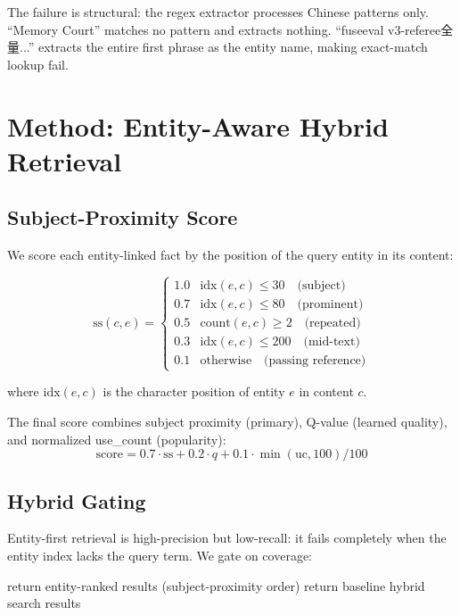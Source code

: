\documentclass[11pt]{article}
\begin{document}
The failure is structural: the regex extractor processes Chinese patterns only. ``Memory Court'' matches no pattern and extracts nothing. ``fuseeval v3-referee全量...'' extracts the entire first phrase as the entity name, making exact-match lookup fail.

\section{Method: Entity-Aware Hybrid Retrieval}

\subsection{Subject-Proximity Score}

We score each entity-linked fact by the position of the query entity in its content:

\begin{equation}
\text{ss}(c, e) = \begin{cases}
1.0 & \text{idx}(e, c) \leq 30 \quad \text{(subject)} \\
0.7 & \text{idx}(e, c) \leq 80 \quad \text{(prominent)} \\
0.5 & \text{count}(e, c) \geq 2 \quad \text{(repeated)} \\
0.3 & \text{idx}(e, c) \leq 200 \quad \text{(mid-text)} \\
0.1 & \text{otherwise} \quad \text{(passing reference)}
\end{cases}
\end{equation}

\noindent where $\text{idx}(e,c)$ is the character position of entity $e$ in content $c$.

The final score combines subject proximity (primary), Q-value (learned quality), and normalized use\_count (popularity):
$$\text{score} = 0.7 \cdot \text{ss} + 0.2 \cdot q + 0.1 \cdot \min(\text{uc}, 100)/100$$

\subsection{Hybrid Gating}

Entity-first retrieval is high-precision but low-recall: it fails completely when the entity index lacks the query term. We gate on coverage:

\begin{algorithmic}
    \STATE return entity-ranked results (subject-proximity order)
\ELSE
    \STATE return baseline hybrid search results
\ENDIF
\end{algorithmic}
\end{document}
